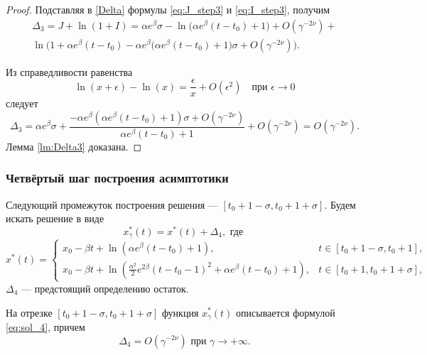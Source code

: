 \begin{proof}
Подставляя в \eqref{Delta} формулы \eqref{eq:J_step3}  и \eqref{eq:I_step3}, получим
\begin{multline}
	\label{eq:Delta_step3}
	\Delta_3=J+\ln(1+I)=\alpha e^{\beta}\sigma-\ln\big(\alpha e^{\beta}(t-t_0)+1\big)+O(\gamma^{-2\nu})+\\ \ln\Big(1+\alpha e^{\beta}(t-t_0)-\alpha e^{\beta}\big(\alpha e^{\beta}(t-t_0)+1\big)\sigma+O(\gamma^{-2\nu})\Big).
\end{multline}

Из справедливости равенства
%
\[\ln(x+\epsilon)-\ln(x) = \frac{\epsilon}{x} + O(\epsilon^2) \quad \text{при } \epsilon \to 0\]
%
следует
\[
\Delta_3 = \alpha e^{\beta}\sigma + \frac{-\alpha e^{\beta}(\alpha e^{\beta}(t - t_0) + 1)\sigma + O(\gamma^{-2\nu})}{\alpha e^{\beta}(t-t_0)+1} + O(\gamma^{-2\nu}) = O(\gamma^{-2\nu}).
\]
Лемма \ref{lm:Delta3} доказана.
\end{proof}

\subsubsection{Четвёртый шаг построения асимптотики}

Следующий промежуток построения решения --- $[t_0 + 1 - \sigma, t_0 + 1 + \sigma]$. Будем искать решение в виде
\begin{equation}
	\label{eq:sol_4}
	x_\gamma^*(t) = x^*(t) + \Delta_4, \text{ где } 
\end{equation}
\small
\begin{equation}
\label{eq:x_star_4_step}
x^*(t) = 
\begin{cases}
x_0 - \beta t + \ln(\alpha e^{\beta}(t - t_0) + 1), & t \in [t_0 + 1 - \sigma, t_0 + 1],\\
x_0 -\beta t + \ln(\frac{\alpha^2}{2} e^{2\beta}(t - t_0 - 1)^2 + \alpha e^{\beta}(t - t_0) + 1), & t \in [t_0 + 1,t_0 + 1 + \sigma],
\end{cases}
\end{equation}
\normalsize
$\Delta_4$ --- предстоящий определению остаток.

\begin{lemma}
\label{lem_Delta4}
На отрезке $[t_0 + 1 - \sigma, t_0 + 1 + \sigma]$ функция $x_\gamma^*(t)$ описывается формулой \eqref{eq:sol_4}, причем
\[
	\Delta_4 = O(\gamma^{-2\nu}) \text{ при } \gamma \to +\infty.
\]
\end{lemma}

